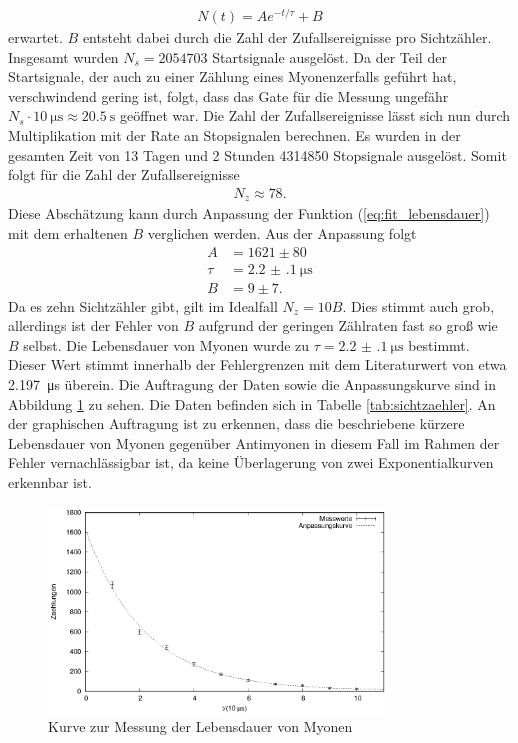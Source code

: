 \begin{align}
  N(t)=A e^{-t/\tau}+B
  \label{eq:fit_lebensdauer}
\end{align}
 erwartet. $B$ entsteht dabei durch die Zahl der Zufallsereignisse pro Sichtzähler.
Insgesamt wurden $N_s=2054703$ Startsignale ausgelöst. Da der Teil der Startsignale, der auch zu einer Zählung eines Myonenzerfalls geführt hat, verschwindend gering ist, folgt, dass das Gate für die Messung ungefähr $N_s \cdot \SI{10}{\micro\second}\approx\SI{20.5}{\second}$ geöffnet war. Die Zahl der Zufallsereignisse lässt sich nun durch Multiplikation mit der Rate an Stopsignalen berechnen. Es wurden in der gesamten Zeit von 13 Tagen und 2 Stunden 4314850 Stopsignale ausgelöst. Somit folgt für die Zahl der Zufallsereignisse 
\begin{align*}
  N_z\approx 78.
\end{align*}
Diese Abschätzung kann durch Anpassung der Funktion (\ref{eq:fit_lebensdauer}) mit dem erhaltenen $B$ verglichen werden. Aus der Anpassung folgt
\begin{align*}
  A&=1621 \pm 80\\
  \tau&=\SI[separate-uncertainty = true]{2.2(1)}{\micro\second}\\
  B&=9 \pm 7.
\end{align*}
Da es zehn Sichtzähler gibt, gilt im Idealfall $N_z=10B$. Dies stimmt auch grob, allerdings ist der Fehler von $B$ aufgrund der geringen Zählraten fast so groß wie $B$ selbst. Die Lebensdauer von Myonen wurde zu $\tau = \SI[separate-uncertainty = true]{2.2(1)}{\micro\second}$ bestimmt. Dieser Wert stimmt innerhalb der Fehlergrenzen mit dem Literaturwert von etwa \SI{2.197}{\micro\second}\cite{pdg} überein. Die Auftragung der Daten sowie die Anpassungskurve sind in Abbildung \ref{fig:lebensdauer} zu sehen. Die Daten befinden sich in Tabelle \ref{tab:sichtzaehler}. An der graphischen Auftragung ist zu erkennen, dass die beschriebene kürzere Lebensdauer von Myonen gegenüber Antimyonen in diesem Fall im Rahmen der Fehler vernachlässigbar ist, da keine Überlagerung von zwei Exponentialkurven erkennbar ist.

\begin{figure}[h]
  \centering
  \includegraphics[width=0.8\textwidth]{./data/lebensdauer.eps}
  \caption{Kurve zur Messung der Lebensdauer von Myonen}
  \label{fig:lebensdauer}
\end{figure}


